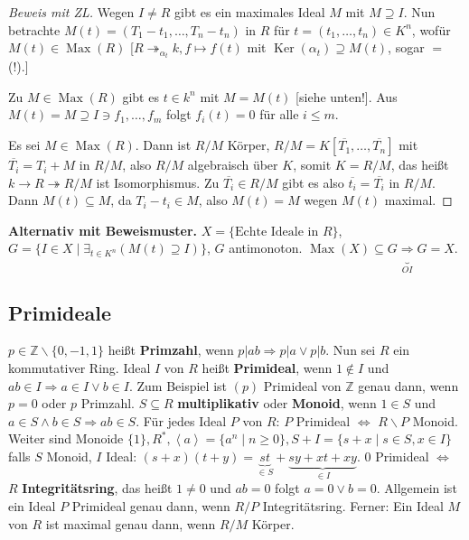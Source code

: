 \documentclass[headsepline=true,DIV=11]{scrartcl}
\theoremstyle{definition}
\renewcommand{\bar}[1]{\overline{#1}}
\newcommand{\Max}{\operatorname{Max}}
\newcommand{\Ker}{\operatorname{Ker}}
\begin{document}
\begin{proof}[Beweis mit ZL]
  Wegen $I\neq R$ gibt es ein maximales Ideal $M$ mit $M\supseteq I$. Nun betrachte $M(t)=(T_1-t_1,\ldots,T_n-t_n)$ in $R$ für $t=(t_1,\ldots,t_n)\in
  K^n$, wofür $M(t)\in\Max(R)$ [$R \twoheadrightarrow_{\alpha_t} k, f\mapsto f(t)$ mit $\Ker(\alpha_t)\supseteq M(t)$, sogar $=$ (!).]

  Zu $M\in\Max(R)$ gibt es $t\in k^n$ mit $M=M(t)$ [siehe unten!]. Aus $M(t)=M\supseteq I\ni f_1,\ldots,f_m$ folgt $f_i(t)=0$ für alle $i\le m$.

  Es sei $M\in\Max(R)$. Dann ist $R/M$ Körper, $R/M=K[\bar{T_1},\ldots,\bar{T_n}]$ mit $\bar{T_i}=T_i+M$ in $R/M$, also $R/M$ algebraisch über $K$,
  somit $K=R/M$, das heißt $k\rightarrow R \twoheadrightarrow R/M$ ist Isomorphismus. Zu $\bar{T_i}\in R/M$ gibt es also $\bar{t_i}=\bar{T_i}$ in
  $R/M$. Dann $M(t)\subseteq M$, da $T_i-t_i\in M$, also $M(t)=M$ wegen $M(t)$ maximal.
\end{proof}

{\bf Alternativ mit Beweismuster.} $X=\{\mbox{Echte Ideale in }R\}$, $G=\{I\in X\mid\exists_{t\in K^n}(M(t)\supseteq I)\}$, $G$
antimonoton. $\Max(X)\subseteq G \underbrace{\Rightarrow}_{OI} G=X$.


\subsection{Primideale}

$p\in\mathbb{Z}\backslash\{0,-1,1\}$ heißt {\bf Primzahl}, wenn $p|ab\Rightarrow p|a \vee p|b$. Nun sei $R$ ein kommutativer Ring. Ideal $I$ von $R$
heißt {\bf Primideal}, wenn $1\not\in I$ und $ab\in I\Rightarrow a\in I \vee b\in I$. Zum Beispiel ist $(p)$ Primideal von $\mathbb{Z}$ genau dann,
wenn $p=0$ oder $p$ Primzahl. $S\subseteq R$ {\bf multiplikativ} oder {\bf Monoid}, wenn $1\in S$ und $a\in S\wedge b\in S\Rightarrow ab\in S$. Für
jedes Ideal $P$ von $R$: $P$ Primideal $\Leftrightarrow$ $R\backslash P$ Monoid. Weiter sind Monoide $\{1\},R^*,\left<a\right>=\{a^n\mid n\ge 0\},
S+I=\{s+x\mid s\in S,x\in I\}$ falls $S$ Monoid, $I$ Ideal: $(s+x)(t+y) = \underbrace{st}_{\in S}+\underbrace{sy+xt+xy}_{\in I}$. $0$ Primideal
$\Leftrightarrow$ $R$ {\bf Integritätsring}, das heißt $1\neq 0$ und $ab=0$ folgt $a=0\vee b=0$. Allgemein ist ein Ideal $P$ Primideal genau dann,
wenn $R/P$ Integritätsring. Ferner: Ein Ideal $M$ von $R$ ist maximal genau dann, wenn $R/M$ Körper.
\end{document}
